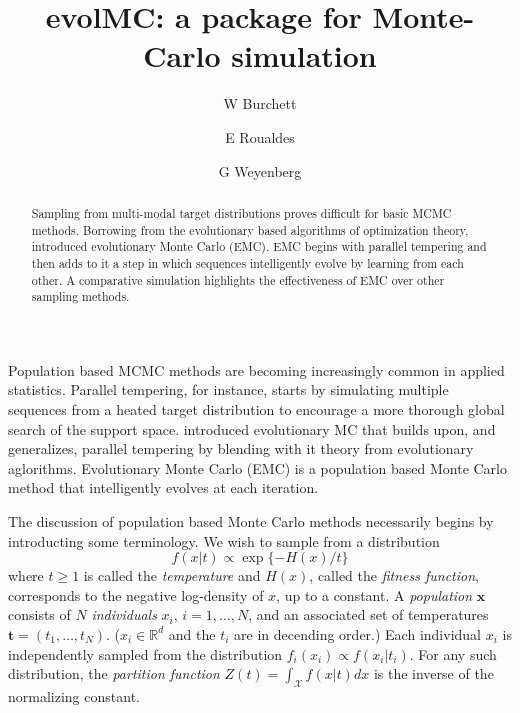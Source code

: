 \documentclass{article}\usepackage[]{graphicx}\usepackage[]{color}
\title{evolMC: a package for Monte-Carlo simulation}
\author{W Burchett \and E Roualdes \and G Weyenberg}
\newcommand{\grady}[1]{\marginpar{#1--Grady}}
\newcommand{\bt}{\mathbf t}
\newcommand{\X}{\mathcal X}
\begin{document}
\maketitle


\begin{abstract}
  Sampling from multi-modal target distributions proves difficult for
  basic MCMC methods.  Borrowing from the evolutionary based
  algorithms of optimization theory, \cite{liang2000evolutionary}
  introduced evolutionary Monte Carlo (EMC).  EMC begins with parallel
  tempering and then adds to it a step in which sequences
  intelligently evolve by learning from each other.  A comparative
  simulation highlights the effectiveness of EMC over other sampling
  methods.
\end{abstract}

\vspace{1cm}
\label{sec:introduction}

Population based MCMC methods are becoming increasingly common in
applied statistics.  Parallel tempering, for instance, starts by
simulating multiple sequences from a heated target distribution to
encourage a more thorough global search of the support space.
\cite{liang2000evolutionary} introduced evolutionary MC that builds
upon, and generalizes, parallel tempering by blending with it theory
from evolutionary aglorithms. Evolutionary Monte Carlo (EMC) is a
population based Monte Carlo method that intelligently evolves at each
iteration.

The discussion of population based Monte Carlo methods necessarily
begins by introducting some terminology.  We wish to sample from a
distribution \[f(x|t) \propto \exp\{ -H(x)/t \}\] where $t\ge 1$ is
called the \emph{temperature} and $H(x)$, called the \emph{fitness
  function}, corresponds to the negative log-density of $x$, up to a
constant. A \emph{population} $\mathbf{x}$ consists of $N$
\emph{individuals} $x_i$, $i = 1, \ldots, N$, and an associated set of
temperatures $\bt = (t_1,\ldots,t_N)$. ($x_i \in \mathbb{R}^d$ and the
$t_i$ are in decending order.) Each
individual $x_i$ is independently sampled from the distribution
$f_i(x_i) \propto f(x_i|t_i)$.  For any such distribution, the
\emph{partition function} $Z(t)= \int_\X f(x|t) dx$ is the inverse of
the normalizing constant. \grady{Citation?  Basic fact?}
\end{document}
